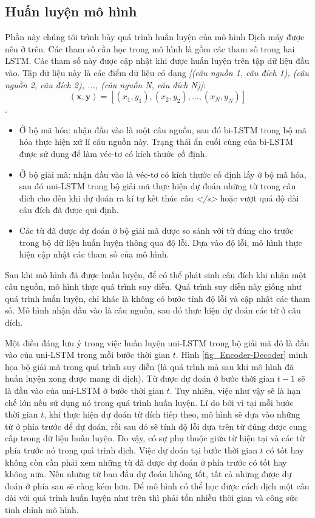 \subsection{Huấn luyện mô hình}
Phần này chúng tôi trình bày quá trình huấn luyện của mô hình Dịch máy được nêu ở trên. Các tham số cần học trong mô hình là gồm các tham số trong hai LSTM. Các tham số này được cập nhật khi được huấn luyện trên tập dữ liệu đầu vào. Tập dữ liệu này là các điểm dữ liệu có dạng \textit{[(câu nguồn 1, câu đích 1), (câu nguồn 2, câu đích 2), ..., (câu nguồn N, câu đích N)]}: $$(\bm{x}, \bm{y}) = [(x_1, y_1), (x_2, y_2), ..., (x_N, y_N)]$$.
\begin{itemize}
	\item Ở bộ mã hóa: nhận đầu vào là một câu nguồn, sau đó bi-LSTM trong bộ mã hóa thực hiện xử lí câu nguồn này. Trạng thái ẩn cuối cùng của bi-LSTM được sử dụng để làm véc-tơ có kích thước cố định.
	\item Ở bộ giải mã: nhận đầu vào là véc-tơ có kích thước cố định lấy ở bộ mã hóa, sau đó uni-LSTM trong bộ giải mã thực hiện dự đoán những từ trong câu đích cho đến khi dự đoán ra kí tự kết thúc câu \textit{</s>} hoặc vượt quá độ dài câu đích đã được qui định.
	\item Các từ đã được dự đoán ở bộ giải mã được so sánh với từ đúng cho trước trong bộ dữ liệu huấn luyện thông qua độ lỗi. Dựa vào độ lỗi, mô hình thực hiện cập nhật các tham số của mô hình.
\end{itemize}

Sau khi mô hình đã được huấn luyện, để có thể phát sinh câu đích khi nhận một câu nguồn, mô hình thực quá trình suy diễn. Quá trình suy diễn này giống như quá trình huấn luyện, chỉ khác là không có bước tính độ lỗi và cập nhật các tham số. Mô hình nhận đầu vào là câu nguồn, sau đó thực hiện dự đoán các từ ở câu đích.

Một điều đáng lưu ý trong việc huấn luyện uni-LSTM trong bộ giải mã đó là đầu vào của uni-LSTM trong mỗi bước thời gian $t$. Hình \ref{fig_Encoder-Decoder} minh họa bộ giải mã trong quá trình suy diễn (là quá trình mà sau khi mô hình đã huấn luyện xong được mang đi dịch). Từ được dự đoán ở bước thời gian $t-1$ sẽ là đầu vào của uni-LSTM ở bước thời gian $t$. Tuy nhiên, việc như vậy sẽ là hạn chế lớn nếu sử dụng nó trong quá trình huấn luyện. Lí do bởi vì tại mỗi bước thời gian $t$, khi thực hiện dự đoán từ đích tiếp theo, mô hình sẽ dựa vào những từ ở phía trước để dự đoán, rồi sau đó sẽ tính độ lỗi dựa trên từ đúng được cung cấp trong dữ liệu huấn luyện. Do vậy, có sự phụ thuộc giữa từ hiện tại và các từ phía trước nó trong quá trình dịch. Việc dự đoán tại bước thời gian $t$ có tốt hay không còn cần phải xem những từ đã được dự đoán ở phía trước có tốt hay không nữa. Nếu những từ ban đầu dự đoán không tốt, tất cả những được dự đoán ở phía sau sẽ càng kém hơn. Để mô hình có thể học được cách dịch một câu dài với quá trình huấn luyện như trên thì phải tốn nhiều thời gian và công sức tinh chỉnh mô hình.
 
